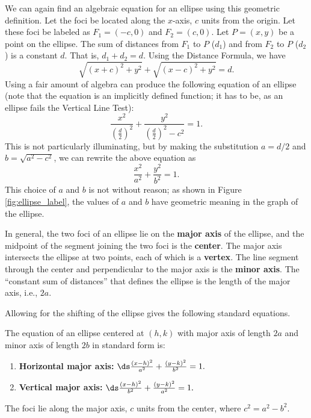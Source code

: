 	We can again find an algebraic equation for an ellipse using this geometric definition. Let the foci be located along the $x$-axis, $c$ units from the origin. Let these foci be labeled as $F_1 = (-c,0)$ and $F_2=(c,0)$. Let $P=(x,y)$ be a point on the ellipse. The sum of distances from $F_1$ to $P$ ($d_1$) and from $F_2$ to $P$ ($d_2$) is a constant $d$. That is, $d_1+d_2=d$. Using the Distance Formula, we have 
	\[
	\sqrt{(x+c)^2+y^2} + \sqrt{(x-c)^2+y^2} = d.
	\]
	Using a fair amount of algebra can produce the following equation of an ellipse (note that the equation is an implicitly defined function; it has to be, as an ellipse fails the Vertical Line Test):
	\[
	\frac{x^2}{\left(\frac d2\right)^2} + \frac{y^2}{\left(\frac d2\right)^2-c^2} = 1.
	\]
	This is not particularly illuminating, but by making the substitution $a=d/2$ and $b=\sqrt{a^2-c^2}$, we can rewrite the above equation as 
	\[
	\frac{x^2}{a^2} + \frac{y^2}{b^2} = 1.
	\]
	This choice of $a$ and $b$ is not without reason; as shown in Figure \ref{fig:ellipse_label}, the values of $a$ and $b$ have geometric meaning in the graph of the ellipse. 
	
	In general, the two foci of an ellipse lie on the \textbf{major axis} of the ellipse, and the midpoint of the segment joining the two foci is the \textbf{center}. The major axis intersects the ellipse at two points, each of which is a \textbf{vertex}. The line segment through the center and perpendicular to the major axis is the \textbf{minor axis}. The ``constant sum of distances'' that defines the ellipse is the length of the major axis, i.e., $2a$.
	
	Allowing for the shifting of the ellipse gives the following standard equations.
	
	{The equation of an ellipse centered at $(h,k)$ with major axis of length $2a$ and minor axis of length $2b$ in standard form is:
	\begin{enumerate}
	\item	\textbf{Horizontal major axis:} $\ds \frac{(x-h)^2}{a^2}+\frac{(y-k)^2}{b^2}=1.$
	
	\item	\textbf{Vertical major axis:} $\ds \frac{(x-h)^2}{b^2}+\frac{(y-k)^2}{a^2}=1.$
	\end{enumerate}
	The foci lie along the major axis, $c$ units from the center, where $c^2=a^2-b^2$.
	}
	
